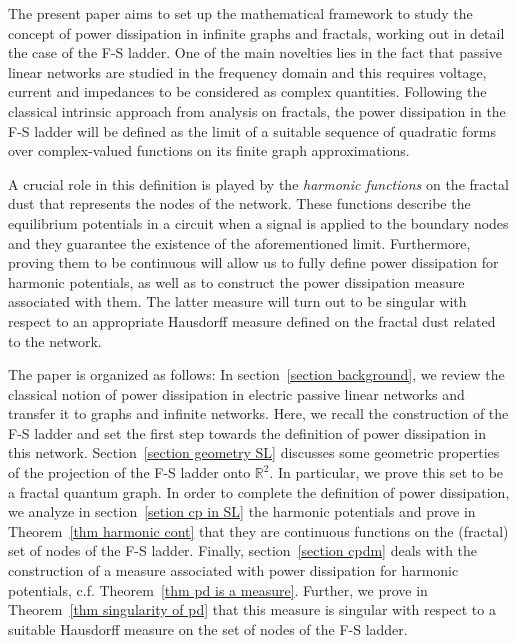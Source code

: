 \documentclass[11pt]{amsart}
\theoremstyle{definition}
\theoremstyle{remark}
\theoremstyle{example}
\numberwithin{equation}{section}
\begin{document}
\medskip

The present paper aims to set up the mathematical framework to study the concept of power dissipation in infinite graphs and fractals, working out in detail the case of the F-S ladder. One of the main novelties lies in the fact that passive linear networks are studied in the frequency domain and this requires voltage, current and impedances to be considered as complex quantities. Following the classical intrinsic approach from analysis on fractals, the power dissipation in the F-S ladder will be defined as the limit of a suitable sequence of quadratic forms over complex-valued functions on its finite graph approximations.

\medskip

A crucial role in this definition is played by the \textit{harmonic functions} on the fractal dust that represents the nodes of the network. These functions describe the equilibrium potentials in a circuit when a signal is applied to the boundary nodes and they guarantee the existence of the aforementioned limit. Furthermore, proving them to be continuous will allow us to fully define power dissipation for harmonic potentials, as well as to construct the power dissipation measure associated with them. The latter measure will turn out to be singular with respect to an appropriate Hausdorff measure defined on the fractal dust related to the network.

\medskip

The paper is organized as follows: In section~\ref{section background}, we review the classical notion of power dissipation in electric passive linear networks and transfer it to graphs and infinite networks. Here, we recall the construction of the F-S ladder and set the first step towards the definition of power dissipation in this network. Section~\ref{section geometry SL} discusses some geometric properties of the projection of the F-S ladder onto ${{\mathbb R}}^2$. In particular, we prove this set to be a fractal quantum graph. In order to complete the definition of power dissipation, we analyze in section~\ref{setion cp in SL} the harmonic potentials and prove in Theorem~\ref{thm harmonic cont} that they are continuous functions on the (fractal) set of nodes of the F-S ladder. Finally, section~\ref{section cpdm} deals with the construction of a measure associated with power dissipation for harmonic potentials, c.f. Theorem~\ref{thm pd is a measure}. Further, we prove in Theorem~\ref{thm singularity of pd} that this measure is singular with respect to a suitable Hausdorff measure on the set of nodes of the F-S ladder.
\end{document}
